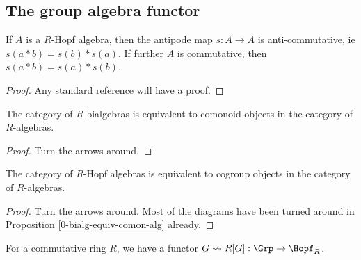 \subsection{The group algebra functor}


\begin{proposition}
  \label{0-antipode-mul}
  \uses{}
  \leanok

  If $A$ is a $R$-Hopf algebra, then the antipode map $s : A \to A$ is anti-commutative, ie $s(a * b) = s(b) * s(a)$. If further $A$ is commutative, then $s(a * b) = s(a) * s(b)$.
\end{proposition}
\begin{proof}
  \uses{}
  \leanok

  Any standard reference will have a proof.
\end{proof}


\begin{proposition}
  \label{0-bialg-equiv-comon-alg}
  \uses{}
  \leanok

  The category of $R$-bialgebras is equivalent to comonoid objects in the category of $R$-algebras.
\end{proposition}
\begin{proof}
  \uses{}
  \leanok

  Turn the arrows around.
\end{proof}


\begin{proposition}
  \label{0-hopf-alg-equiv-cogrp-alg}
  \uses{}
  \leanok

  The category of $R$-Hopf algebras is equivalent to cogroup objects in the category of $R$-algebras.
\end{proposition}
\begin{proof}
  \leanok

  Turn the arrows around.
  Most of the diagrams have been turned around in Proposition \ref{0-bialg-equiv-comon-alg} already.
\end{proof}


\begin{definition}
  \label{0-grp-alg}
  \uses{}
  \leanok

  For a commutative ring $R$, we have a functor $G \rightsquigarrow R[G] : \Grp \to \Hopf_R$.
\end{definition}


